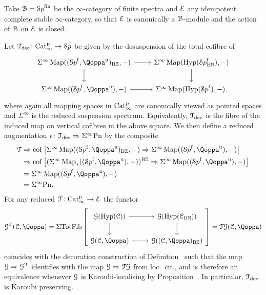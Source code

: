 \begin{example}
\label{example:decoration}%
Take $\mathcal{B} = {\mathcal Sp}^{\mathrm{fin}}$ be the $\infty$-category of finite spectra and $\mathcal{E}$ any idempotent complete stable $\infty$-category, so that $\mathcal{E}$ is canonically a $\mathcal{B}$-module and the action of $\mathcal{B}$ on $\mathcal{E}$ is closed.

Let $\mathcal{T}_{\mathrm{dec}}\colon \mathrm{Cat}^{\mathrm p}_\infty \to {\mathcal Sp}$ be given by the desuspension of the total cofibre of 
\[
\begin{tikzcd}
\Sig^{\infty}\Map((\Spaf,\QF^{\uni})_{\B\ZZ},-) \ar[r]\ar[d] & \Sig^{\infty}\Map(\Hyp(\Spaf_{\B\NN}),-) \ar[d] \\
\Sigma^{\infty}\Map((\Spaf,\QF^{\uni}),-)\ar[r] & \Sigma^{\infty}\Map(\Hyp(\Spaf),-),
\end{tikzcd}
\]
where again all mapping spaces in $\mathrm{Cat}^{\mathrm p}_\infty$ are canonically viewed as pointed spaces and $\Sigma^{\infty}$ is the reduced suspension spectrum. Equivalently, $\mathcal{T}_{\mathrm{dec}}$ is the fibre of the induced map on vertical cofibres in the above square.
We then define a reduced augmentation $\epsilon\colon \mathcal{T}_{\mathrm{dec}} \Rightarrow \Sigma^{\infty}\mathrm{Pn}$ by the composite
\begin{align*}
\T &\Rightarrow \cof\big[\Sig^{\infty}\Map((\Spaf,\QF^{\uni})_{\B\ZZ},-) \Rightarrow \Sig^{\infty}\Map((\Spaf,\QF^{\uni}),-)\big] \\
& \Rightarrow \cof\big[(\Sig^{\infty} \Map_*((\Spaf,\QF^{\uni}),-))^{\B\ZZ} \Rightarrow \Sig^{\infty}\Map((\Spaf,\QF^{\uni}),-)\big] \\
& = \Sig^{\infty}\Map((\Spaf,\QF^{\uni}),-)\\
& = \Sig^{\infty}\Poinc.
\end{align*}
For any reduced $\mathcal{F}\colon \mathrm{Cat}^{\mathrm p}_\infty \to \mathcal{E}$ the functor
\[
\G^{\T}(\C,\QF) = \Sig\TotFib\left[
\begin{tikzcd}
\G(\Hyp(\C)) \ar[r]\ar[d] & \G(\Hyp(\C_{\B\NN})) \ar[d] \\
\G(\C,\QF) \ar[r] & \G((\C,\QF)_{\B\ZZ})
\end{tikzcd}\right] = \T\G(\C,\QF)
\]
coincides with the decoration construction of Definition~ such that the map $\mathcal{G} \Rightarrow \mathcal{G}^{\mathcal{T}}$ identifies with the map $\mathcal{G}\Rightarrow \mathcal{T}\mathcal{G}$ from loc.\ cit., and is therefore an equivalence whenever $\mathcal{G}$ is Karoubi-localising by Proposition~. In particular, $\mathcal{T}_{\mathrm{dec}}$ is Karoubi preserving.
\end{example}

